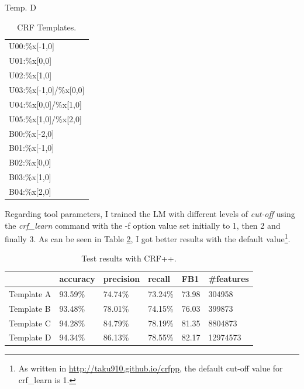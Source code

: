 \documentclass[a4paper,7pt,oneside]{book}
\begin{document}
\begin{table}[!htb]
\begin{minipage}[b]{.22\linewidth}
      \caption{Temp. D}
      \centering
        \begin{tabular}{|l|}
		\hline
		U00:\%x[-1,0] \hspace{1.9em} \\
		U01:\%x[0,0] \\
		U02:\%x[1,0] \\
		U03:\%x[-1,0]/\%x[0,0] \\
		U04:\%x[0,0]/\%x[1,0] \\
		U05:\%x[1,0]/\%x[2,0] \\
		B00:\%x[-2,0] \\
		B01:\%x[-1,0] \\
		B02:\%x[0,0] \\
		B03:\%x[1,0] \\
		B04:\%x[2,0] \\ \hline
		\end{tabular}
    \end{minipage}
    \caption{CRF Templates.}
    \label{table:crf_templates}
\end{table}

\noindent
Regarding tool parameters, I trained the LM with different levels of \textit{cut-off} using the \textit{crf\_learn} command with the -f option value set initially to 1, then 2 and finally 3. As can be seen in Table \ref{table:crf_results}, I got better results with the default value\footnote{As written in \url{http://taku910.github.io/crfpp}, the default cut-off value for crf\_learn is 1.}.

\begin{table}[h!]
\small
	\begin{center}
	\begin{tabular}{|l|l|l|l|l|l|}
		\cline{2-6}
		\multicolumn{1}{r|}{} & accuracy & precision & recall & FB1 & \#features \\ \hline
		Template A & 93.59\% & 74.74\% & 73.24\% & 73.98 & 304958 \\ \hline
		Template B & 93.48\% & 78.01\% & 74.15\% & 76.03 & 399873 \\ \hline
		Template C & 94.28\% & 84.79\% & 78.19\% & 81.35 & 8804873 \\ \hline \rowcolor{LightCyan}
		Template D & 94.34\% & 86.13\% & 78.55\% & 82.17 & 12974573 \\ \hline
	\end{tabular}
	\caption{Test results with CRF++.}
	\label{table:crf_results}
	\end{center}
\end{table}
\end{document}
